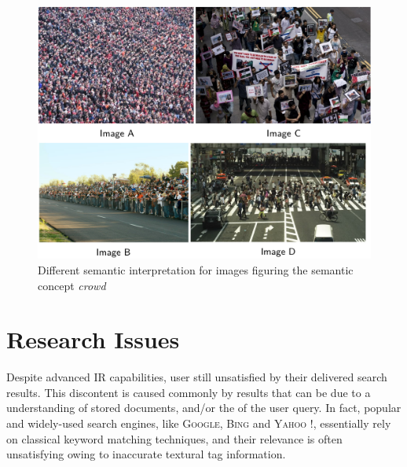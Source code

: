 	\begin{figure}[ht!]
		\centering
		\includegraphics[scale=0.6]{figures/introduction_1.pdf}
		\caption{Different semantic interpretation for images figuring the semantic concept \emph{crowd}}
		\label{introduction_1}
	\end{figure}

	\section{Research Issues}
	Despite advanced \gls{IR} capabilities, user still unsatisfied by their delivered search results. This discontent 
	is caused commonly by  results that can be due to a  understanding of stored documents, 
	and/or the  of the user query. In fact, popular and widely-used search engines, 
	like \textsc{Google}, \textsc{Bing} and \textsc{Yahoo !}, essentially rely on classical 
	keyword matching techniques, and their relevance is often unsatisfying owing to inaccurate 
	textural tag information.

